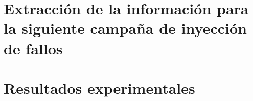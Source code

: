 
\section{Extracción de la información para la siguiente campaña de inyección de
fallos}
\label{sec:InfoCampana}





\section{Resultados experimentales}
\label{sec:IterResults}






\endinput
